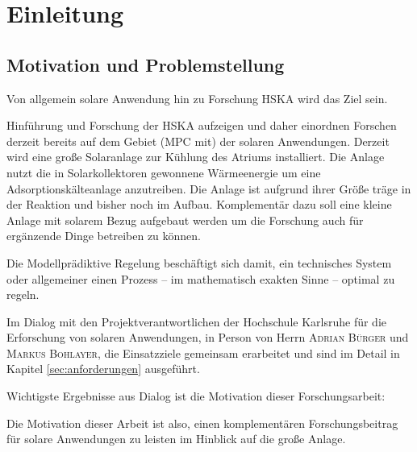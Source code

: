 %
%

\renewcommand{\chapterheadstartvskip}{\vspace*{2cm}}

\chapter{Einleitung}
\label{chap:einleitung}
\setcounter{page}{1}
\renewcommand{\chapterheadstartvskip}{\vspace*{-1cm}}


\section{Motivation und Problemstellung}
\label{sec:motivation}

Von allgemein solare Anwendung hin zu Forschung HSKA wird das Ziel sein.

Hinführung und Forschung der HSKA aufzeigen und daher einordnen Forschen derzeit bereits auf dem Gebiet (MPC mit) der solaren Anwendungen. Derzeit wird eine große Solaranlage zur Kühlung des Atriums installiert. Die Anlage nutzt die in Solarkollektoren gewonnene Wärmeenergie um eine Adsorptionskälteanlage anzutreiben. Die Anlage ist aufgrund ihrer Größe träge in der Reaktion und bisher noch im Aufbau. Komplementär dazu soll eine kleine Anlage mit solarem Bezug aufgebaut werden um die Forschung auch für ergänzende Dinge betreiben zu können.

Die Modellprädiktive Regelung beschäftigt sich damit, ein technisches System oder allgemeiner einen Prozess -- im mathematisch exakten Sinne -- optimal zu regeln.

Im Dialog mit den Projektverantwortlichen der Hochschule Karlsruhe für die Erforschung von solaren Anwendungen, in Person von Herrn \textsc{Adrian Bürger} und \textsc{Markus Bohlayer}, die Einsatzziele gemeinsam erarbeitet und sind im Detail in Kapitel \ref{sec:anforderungen} ausgeführt.

Wichtigste Ergebnisse aus Dialog ist die Motivation dieser Forschungsarbeit:

Die Motivation dieser Arbeit ist also, einen komplementären Forschungsbeitrag für solare Anwendungen zu leisten im Hinblick auf die große Anlage.

